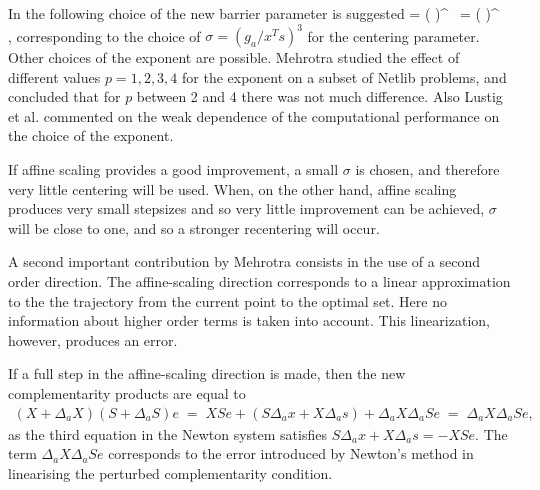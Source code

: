 In \cite{Mehrotra92} the following choice of the new barrier parameter 
is suggested
%
\be \label{Mu}
  \mu = \left(  \right)^{} \, 
           = \left(  \right)^{} \, ,
\ee
%
corresponding to the choice of $\sigma = (g_a / x^Ts)^3$ 
for the centering parameter. 
Other choices of the exponent are possible. Mehrotra \cite{Mehrotra92}
studied the effect of different values $p=1,2,3,4$ for the exponent
on a subset of Netlib problems, and concluded that for $p$ between
2 and 4 there was not much difference.
Also Lustig et al. \cite{LustigMarstenShanno} commented on the
weak dependence of the computational performance on the choice 
of the exponent.



If affine scaling provides a good improvement, a small $\sigma$ 
is chosen, and therefore very little centering will be used. When, 
on the other hand, affine scaling produces very small stepsizes 
and so very little improvement can be achieved, $\sigma$ will be 
close to one, and so a stronger recentering will occur.


A second important contribution by Mehrotra consists in the 
use of a second order direction. The affine-scaling direction 
corresponds to a linear approximation to the the trajectory from 
the current point to the optimal set. Here no information about 
higher order terms is taken into account. This linearization, 
however, produces an error.


If a full step in the affine-scaling direction is made, then 
the new complementarity products are equal to
%
\begin{eqnarray*}
  (X + \Delta_a X) (S + \Delta_a S) e 
   \;=\; XSe + (S \Delta_a x + X \Delta_a s) + \Delta_a X \Delta_a S e
   \;=\; \Delta_a X \Delta_a S e,
\end{eqnarray*}
%
as the third equation in the Newton system satisfies 
$S \Delta_a x + X \Delta_a s = -XSe.$
%
The term $\Delta_a X \Delta_a S e$ corresponds to the error introduced
by Newton's method in linearising the perturbed complementarity condition.


